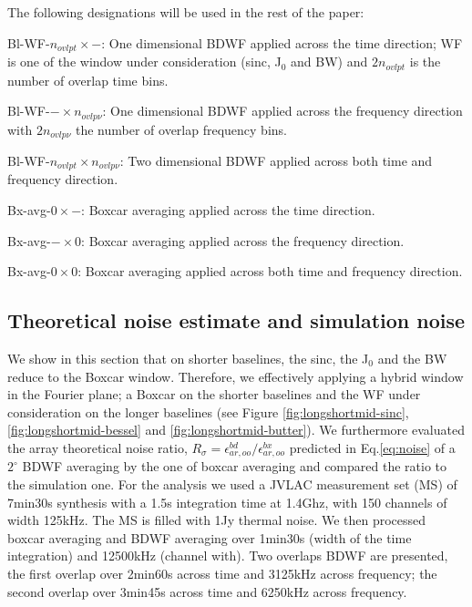 \documentclass[useAMS,usenatbib]{mn2e}
\begin{document}
The following designations will be used in the rest of the paper:

Bl-WF-$n_{ovlpt}\times -$: One dimensional BDWF applied across the time direction; WF is one of the window under 
consideration (sinc, J$_0$ and BW) and $2n_{ovlpt}$ is the number of overlap time bins.

Bl-WF-$-\times n_{ovlp\nu}$: One dimensional BDWF applied across the frequency direction with $2n_{ovlp\nu}$ the number of overlap 
frequency bins.

Bl-WF-$n_{ovlpt}\times n_{ovlp\nu}$: Two dimensional BDWF applied across both time and frequency direction.

Bx-avg-$0\times -$: Boxcar averaging applied across the time direction.

Bx-avg-$-\times 0$: Boxcar averaging applied across the frequency direction. 

Bx-avg-$0\times 0$: Boxcar averaging applied across both time and frequency direction.



\subsection{Theoretical noise estimate and simulation noise}
\label{subsec:noise}
 We show in this section that on shorter baselines, the sinc, the J$_0$ and the BW reduce to the Boxcar window. 
Therefore, we effectively applying a hybrid window in the Fourier plane; a Boxcar on the shorter baselines 
and the WF under consideration on the longer baselines (see Figure \ref{fig:longshortmid-sinc}, \ref{fig:longshortmid-bessel} and 
\ref{fig:longshortmid-butter}). We furthermore evaluated the array
theoretical noise ratio, $R_{\sigma}=\epsilon_{ar,oo}^{bd}/\epsilon_{ar,oo}^{bx}$ predicted in Eq.\ref{eq:noise} of a $2^\circ$ BDWF 
averaging  by the one of boxcar averaging and compared the ratio to the simulation one. For the 
analysis we used a JVLAC measurement set (MS) of 7min30s synthesis with a 1.5s
integration time at 1.4Ghz, with 150 channels of width 125kHz. The MS is filled with 1Jy thermal noise. We then processed boxcar 
averaging and BDWF averaging over 1min30s (width of the time integration) and 12500kHz (channel with). Two overlaps BDWF are presented, 
the first overlap over 2min60s across time and 3125kHz across frequency; the second overlap over 3min45s across time and 6250kHz across 
frequency.
\end{document}
